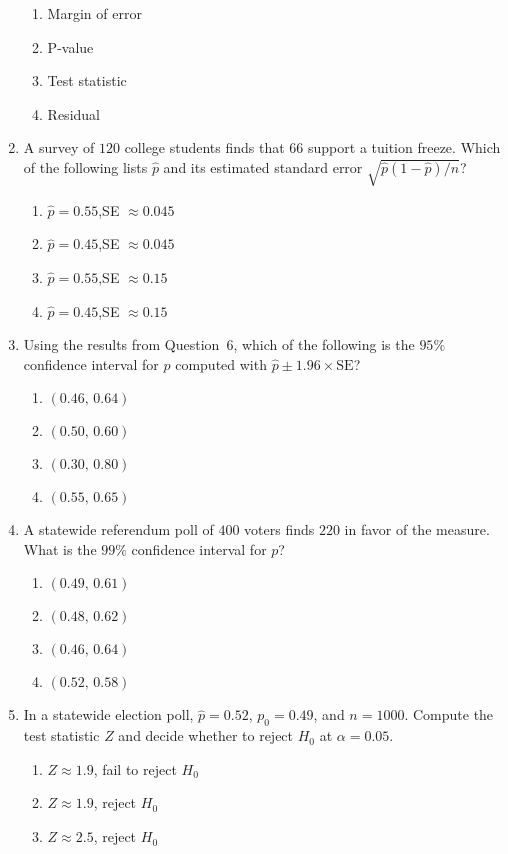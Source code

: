 \documentclass{article}
\begin{document}
\begin{enumerate}
\begin{enumerate}[label=(\Alph*)]
  \item Margin of error
  \item P-value
  \item Test statistic
  \item Residual
  \end{enumerate}
\item A survey of $120$ college students finds that $66$ support a tuition freeze. Which of the following lists $\hat{p}$ and its estimated standard error $\sqrt{\hat{p}(1-\hat{p})/n}$?
  \begin{enumerate}[label=(\Alph*)]
  \item $\hat{p}=0.55$,\quad SE $\approx0.045$
  \item $\hat{p}=0.45$,\quad SE $\approx0.045$
  \item $\hat{p}=0.55$,\quad SE $\approx0.15$
  \item $\hat{p}=0.45$,\quad SE $\approx0.15$
  \end{enumerate}
\item Using the results from Question~6, which of the following is the $95\%$ confidence interval for $p$ computed with $\hat{p}\pm1.96\times\text{SE}$?
  \begin{enumerate}[label=(\Alph*)]
  \item $(0.46,\,0.64)$
  \item $(0.50,\,0.60)$
  \item $(0.30,\,0.80)$
  \item $(0.55,\,0.65)$
  \end{enumerate}
\item A statewide referendum poll of $400$ voters finds $220$ in favor of the measure. What is the $99\%$ confidence interval for $p$?
  \begin{enumerate}[label=(\Alph*)]
  \item $(0.49,\,0.61)$
  \item $(0.48,\,0.62)$
  \item $(0.46,\,0.64)$
  \item $(0.52,\,0.58)$
  \end{enumerate}
\item In a statewide election poll, $\hat{p}=0.52$, $p_0=0.49$, and $n=1000$. Compute the test statistic $Z$ and decide whether to reject $H_0$ at $\alpha=0.05$.
  \begin{enumerate}[label=(\Alph*)]
  \item $Z\approx1.9$, fail to reject $H_0$
  \item $Z\approx1.9$, reject $H_0$
  \item $Z\approx2.5$, reject $H_0$

\end{enumerate}
\end{enumerate}
\end{document}
